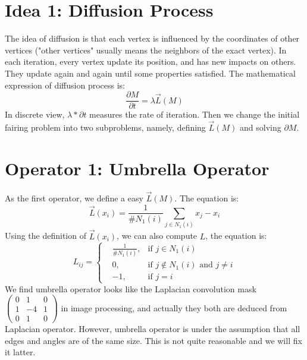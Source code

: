\documentclass[tog]{acmsiggraph}
\begin{document}
\section{Idea 1: Diffusion Process}

The idea of diffusion is that each vertex is influenced by the coordinates of other vertices ("other vertices" usually means the neighbors of the exact vertex). In each iteration, every vertex update its position, and has new impacts on others. They update again and again until some properties satisfied. The mathematical expression of diffusion process is:
\begin{equation}
	\label{Eq_diffusion_process}
	\frac{\partial M}{\partial t} = \lambda \vec{L}(M)
\end{equation}
In discrete view, $\lambda * \partial t$ measures the rate of iteration. Then we change the initial fairing problem into two subproblems, namely, defining $\vec{L}(M)$ and solving $\partial M$.


\section{Operator 1: Umbrella Operator}

As the first operator, we define a easy $\vec{L}(M)$. The equation is:
\begin{equation}
	\label{Eq_umbrella_operator}
	\vec{L}(x_i) = \frac{1}{\#N_1(i)} \sum_{j \in N_1(i)} x_j - x_i
\end{equation}
Using the definition of $\vec{L}(x_i)$, we can also compute $L$, the equation is:
\begin{equation}
	L_{ij} = \left\{
	\begin{aligned}
		& \frac{1}{\#N_1(i)}, & \mbox{if $j \in N_1(i)$} \\
		& 0, & \mbox{if $j \notin N_1(i)$ and $j \not= i$} \\
		& -1, & \mbox{if $j=i$}
	\end{aligned}
	\right.
\end{equation}
We find umbrella operator looks like the Laplacian convolution mask 
$\left(	
\begin{matrix}
	0 & 1 & 0 \\
	1 &-4 & 1 \\
	0 & 1 & 0
\end{matrix}
\right)$
in image processing, and actually they both are deduced from Laplacian operator. However, umbrella operator is under the assumption that all edges and angles are  of the same size. This is not quite reasonable and we will fix it latter.
\end{document}
